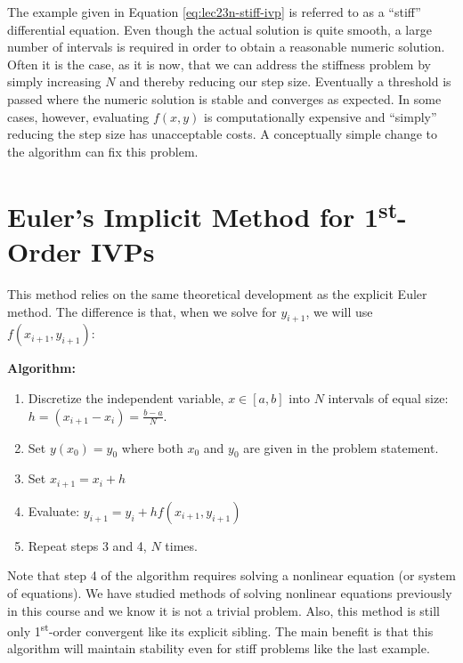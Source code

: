 The example given in Equation \ref{eq:lec23n-stiff-ivp} is referred to as a ``stiff'' differential equation.  Even though the actual solution is quite smooth, a large number of intervals is required in order to obtain a reasonable numeric solution.  Often it is the case, as it is now, that we can address the stiffness problem by simply increasing $N$ and thereby reducing our step size.  Eventually a threshold is passed where the numeric solution is stable and converges as expected.  In some cases, however, evaluating $f(x,y)$ is computationally expensive and ``simply'' reducing the step size has unacceptable costs.  A conceptually simple change to the algorithm can fix this problem.

\section{Euler's Implicit Method for 1\textsuperscript{st}-Order IVPs}
This method relies on the same theoretical development as the explicit Euler method.  The difference is that, when we solve for $y_{i+1}$, we will use $f(x_{i+1},y_{i+1})$:

\vspace{0.2cm}

\noindent\textbf{Algorithm:}
\begin{enumerate}
\item Discretize the independent variable, $x \in [a,b]$ into $N$ intervals of equal size: $h = (x_{i+1}-x_i) = \frac{b-a}{N}$.
\item Set $y(x_0) = y_0$ where both $x_0$ and $y_0$ are given in the problem statement.
\item Set $x_{i+1} = x_i + h$
\item Evaluate: $y_{i+1} = y_i + hf(x_{i+1},y_{i+1})$
\item Repeat steps 3 and 4, $N$ times.
\end{enumerate}
Note that step 4 of the algorithm requires solving a nonlinear equation (or system of equations).  We have studied methods of solving nonlinear equations previously in this course and we know it is not a trivial problem.  Also, this method is still only 1\textsuperscript{st}-order convergent like its explicit sibling.  The main benefit is that this algorithm will maintain stability even for stiff problems like the last example.

